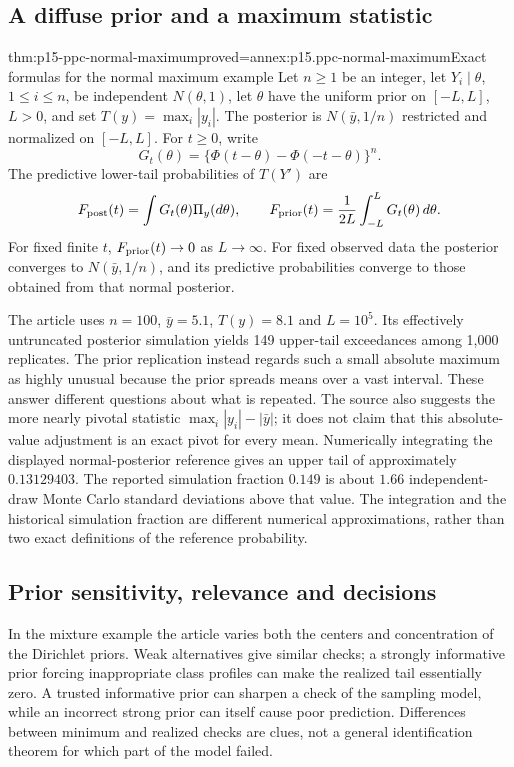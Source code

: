 \subsection{A diffuse prior and a maximum statistic}
\begin{hbtheorem}{thm:p15-ppc-normal-maximum}{proved=annex:p15.ppc-normal-maximum}{Exact formulas for the normal maximum example}
Let \(n\geq1\) be an integer, let \(Y_i\mid\theta\), \(1\leq i\leq n\), be independent \(N(\theta,1)\), let
\(\theta\) have the uniform prior on \([-L,L]\), \(L>0\), and set
\(T(y)=\max_i|y_i|\). The posterior is
\(N(\bar y,1/n)\) restricted and normalized on \([-L,L]\).
For \(t\geq0\), write
\[
 G_t(\theta)=\{\Phi(t-\theta)-\Phi(-t-\theta)\}^n.
\]
The predictive lower-tail probabilities of \(T(Y')\) are
\[
 F_{\rm post}(t)=\int G_t(\theta)\Pi_y(d\theta),\qquad
 F_{\rm prior}(t)=\frac1{2L}\int_{-L}^L G_t(\theta)\,d\theta.
\]
For fixed finite \(t\), \(F_{\rm prior}(t)\to0\) as \(L\to\infty\).
For fixed observed data the posterior converges to
\(N(\bar y,1/n)\), and its predictive probabilities converge to those
obtained from that normal posterior.
\end{hbtheorem}

The article uses \(n=100\), \(\bar y=5.1\), \(T(y)=8.1\) and
\(L=10^5\). Its effectively untruncated posterior simulation yields
149 upper-tail exceedances among 1,000 replicates. The prior replication
instead regards such a small absolute maximum as highly unusual because
the prior spreads means over a vast interval. These answer different
questions about what is repeated. The source also suggests the more nearly
pivotal statistic \(\max_i|y_i|-|\bar y|\); it does not claim that this
absolute-value adjustment is an exact pivot for every mean.
Numerically integrating the displayed normal-posterior reference gives
an upper tail of approximately \(0.13129403\). The reported simulation
fraction \(0.149\) is about \(1.66\) independent-draw Monte Carlo
standard deviations above that value. The integration and the historical
simulation fraction are different numerical approximations, rather than
two exact definitions of the reference probability.

\subsection{Prior sensitivity, relevance and decisions}
In the mixture example the article varies both the centers and concentration
of the Dirichlet priors. Weak alternatives give similar checks; a strongly
informative prior forcing inappropriate class profiles can make the realized
tail essentially zero. A trusted informative prior can sharpen a check of
the sampling model, while an incorrect strong prior can itself cause poor
prediction. Differences between minimum and realized checks are clues,
not a general identification theorem for which part of the model failed.

